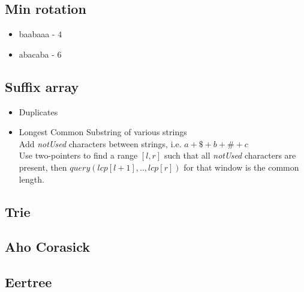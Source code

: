 \subsection{Min rotation }

\begin{itemize}[noitemsep]
  \item baabaaa - $4$
  \item abacaba - $6$
\end{itemize}

\subsection{Suffix array }

\begin{itemize}[noitemsep]
  \item Duplicates 

  \item Longest Common Substring of various strings \\
  Add \emph{notUsed} characters between strings, i.e. $a + \$ + b + \# + c$ \\ 
  Use two-pointers to find a range $[l, r]$ such that all \emph{notUsed} characters are present, then $query(lcp[l + 1],..,lcp[r])$ for that window is the common length. \\

\end{itemize}

\subsection{Trie }

\subsection{Aho Corasick }


\subsection{Eertree }


